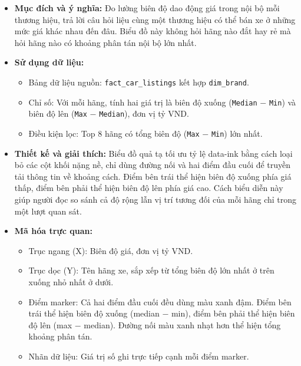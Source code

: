 \begin{itemize}
    \item \textbf{Mục đích và ý nghĩa:} Đo lường biên độ dao động giá trong nội bộ mỗi thương hiệu, trả lời câu hỏi liệu cùng một thương hiệu có thể bán xe ở những mức giá khác nhau đến đâu. Biểu đồ này không hỏi hãng nào đắt hay rẻ mà hỏi hãng nào có khoảng phân tán nội bộ lớn nhất.

    \item \textbf{Sử dụng dữ liệu:}
    \begin{itemize}
        \item Bảng dữ liệu nguồn: \texttt{fact\_car\_listings} kết hợp \texttt{dim\_brand}.
        \item Chỉ số: Với mỗi hãng, tính hai giá trị là biên độ xuống (\texttt{Median} $-$ \texttt{Min}) và biên độ lên (\texttt{Max} $-$ \texttt{Median}), đơn vị tỷ VND.
        \item Điều kiện lọc: Top 8 hãng có tổng biên độ (\texttt{Max} $-$ \texttt{Min}) lớn nhất.
    \end{itemize}

    \item \textbf{Thiết kế và giải thích:} Biểu đồ quả tạ tối ưu tỷ lệ data-ink bằng cách loại bỏ các cột khối nặng nề, chỉ dùng đường nối và hai điểm đầu cuối để truyền tải thông tin về khoảng cách. Điểm bên trái thể hiện biên độ xuống phía giá thấp, điểm bên phải thể hiện biên độ lên phía giá cao. Cách biểu diễn này giúp người đọc so sánh cả độ rộng lẫn vị trí tương đối của mỗi hãng chỉ trong một lượt quan sát.

    \item \textbf{Mã hóa trực quan:}
    \begin{itemize}
        \item Trục ngang (X): Biên độ giá, đơn vị tỷ VND.
        \item Trục dọc (Y): Tên hãng xe, sắp xếp từ tổng biên độ lớn nhất ở trên xuống nhỏ nhất ở dưới.
        \item Điểm marker: Cả hai điểm đầu cuối đều dùng màu xanh đậm. Điểm bên trái thể hiện biên độ xuống (median $-$ min), điểm bên phải thể hiện biên độ lên (max $-$ median). Đường nối màu xanh nhạt hơn thể hiện tổng khoảng phân tán.
        \item Nhãn dữ liệu: Giá trị số ghi trực tiếp cạnh mỗi điểm marker.
    \end{itemize}


\end{itemize}
